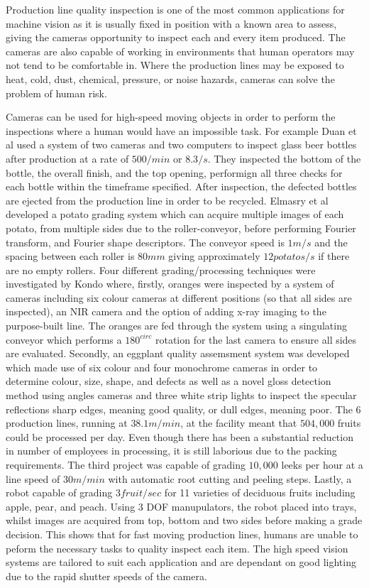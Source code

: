 \documentclass[fleqn,twoside]{article}
\begin{document}
Production line quality inspection is one of the most common applications for machine vision as it is usually fixed in position with a known area to assess, giving the cameras opportunity to inspect each and every item produced. The cameras are also capable of working in environments that human operators may not tend to be comfortable in. Where the production lines may be exposed to heat, cold, dust, chemical, pressure, or noise hazards, cameras can solve the problem of human risk. 

Cameras can be used for high-speed moving objects in order to perform the inspections where a human would have an impossible task. For example Duan et al \cite{duan} used a system of two cameras and two computers to inspect glass beer bottles after production at a rate of $500/min$ or $8.3/s$. They inspected the bottom of the bottle, the overall finish, and the top opening, performign all three checks for each bottle within the timeframe specified. After inspection, the defected bottles are ejected from the production line in order to be recycled. Elmasry et al \cite{elmasry1} developed a potato grading system which can acquire multiple images of each potato, from multiple sides due to the roller-conveyor, before performing Fourier transform, and Fourier shape descriptors. The conveyor speed is $1m/s$ and the spacing between each roller is $80mm$ giving approximately $12 potatos/s$ if there are no empty rollers. Four different grading/processing techniques were investigated by Kondo \cite{kondo} where, firstly, oranges were inspected by a system of cameras including six colour cameras at different positions (so that all sides are inspected), an NIR camera and the option of adding x-ray imaging to the purpose-built line. The oranges are fed through the system using a singulating conveyor which performs a $180^{circ}$ rotation for the last camera to ensure all sides are evaluated. Secondly, an eggplant quality assemsment system was developed which made use of six colour and four monochrome cameras in order to determine colour, size, shape, and defects as well as a novel gloss detection method using angles cameras and three white strip lights to inspect the specular reflections sharp edges, meaning good quality, or dull edges, meaning poor. The 6 production lines, running at $38.1m/min$, at the facility meant that $504,000$ fruits could be processed per day. Even though there has been a substantial reduction in number of employees in processing, it is still laborious due to the packing requirements. The third project was capable of grading $10,000$ leeks per hour at a line speed of $30m/min$ with automatic root cutting and peeling steps. Lastly, a robot capable of grading $3 fruit/sec$ for 11 varieties of deciduous fruits including apple, pear, and peach. Using 3 DOF manupulators, the robot placed into trays, whilst images are acquired from top, bottom and two sides before making a grade decision. This shows that for fast moving production lines, humans are unable to peform the necessary tasks to quality inspect each item. The high speed vision systems are tailored to suit each application and are dependant on good lighting due to the rapid shutter speeds of the camera.
\end{document}
